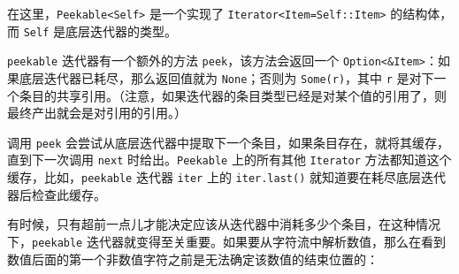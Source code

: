 在这里，\texttt{Peekable<Self>} 是一个实现了 \texttt{Iterator<Item=Self::Item>} 的结构体，而 \texttt{Self} 是底层迭代器的类型。

\texttt{peekable} 迭代器有一个额外的方法 \texttt{peek}，该方法会返回一个 \texttt{Option<\&Item>}：如果底层迭代器已耗尽，那么返回值就为 \texttt{None}；否则为 \texttt{Some(r)}，其中 \texttt{r} 是对下一个条目的共享引用。（注意，如果迭代器的条目类型已经是对某个值的引用了，则最终产出就会是对引用的引用。）

调用 \texttt{peek} 会尝试从底层迭代器中提取下一个条目，如果条目存在，就将其缓存，直到下一次调用 \texttt{next} 时给出。\texttt{Peekable} 上的所有其他 \texttt{Iterator} 方法都知道这个缓存，比如，\texttt{peekable} 迭代器 \texttt{iter} 上的 \texttt{iter.last()} 就知道要在耗尽底层迭代器后检查此缓存。

有时候，只有超前一点儿才能决定应该从迭代器中消耗多少个条目，在这种情况下，\texttt{peekable} 迭代器就变得至关重要。如果要从字符流中解析数值，那么在看到数值后面的第一个非数值字符之前是无法确定该数值的结束位置的：

